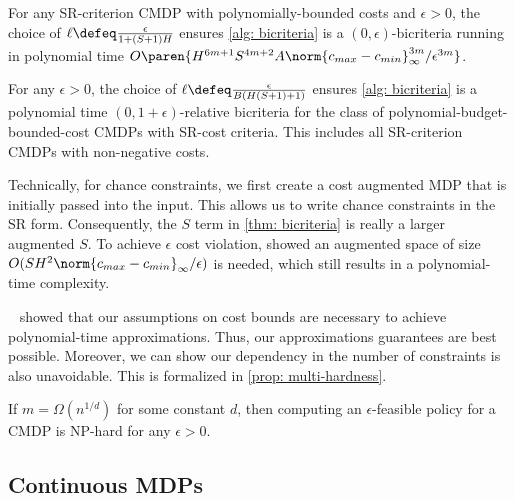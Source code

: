 \documentclass[pdftex, a4paper, 12pt]{article}
\newcommand{\cmin}{c_{min}}
\newcommand{\cmax}{c_{max}}
\begin{document}
\begin{theorem}[Bicriteria]\label{thm: bicriteria}
    For any SR-criterion CMDP with polynomially-bounded costs and $\epsilon > 0$, the choice of $\ell \defeq \frac{\epsilon}{1 + (S+1)H}$ ensures \cref{alg: bicriteria} is a $(0, \epsilon)$-bicriteria running in polynomial time $O\paren{H^{6m+1}S^{4m+2}A\norm{\cmax - \cmin}_{\infty}^{3m}/\epsilon^{3m}}$. 
\end{theorem}

\begin{corollary}[Relative]\label{cor: relative}
    For any $\epsilon > 0$, the choice of $\ell \defeq \frac{\epsilon}{B(H(S+1) + 1)}$ ensures \cref{alg: bicriteria} is a polynomial time $(0, 1+\epsilon)$-relative bicriteria for the class of polynomial-budget-bounded-cost CMDPs with SR-cost criteria. This includes all SR-criterion CMDPs with non-negative costs.
\end{corollary}

\begin{remark}
    Technically, for chance constraints, we first create a cost augmented MDP that is initially passed into the input. This allows us to write chance constraints in the SR form. Consequently, the $S$ term in \cref{thm: bicriteria} is really a larger augmented $S$. To achieve $\epsilon$ cost violation, \cite{acRL} showed an augmented space of size $O(SH^2\norm{\cmax - \cmin}_{\infty}/\epsilon)$ is needed, which still results in a polynomial-time complexity.
\end{remark}

\begin{remark}\label{rem: optimality}
    ~\cite{acRL} showed that our assumptions on cost bounds are necessary to achieve polynomial-time approximations. Thus, our approximations guarantees are best possible. Moreover, we can show our dependency in the number of constraints is also unavoidable. This is formalized in \cref{prop: multi-hardness}.
\end{remark}

\begin{proposition}\label{prop: multi-hardness}
    If $m = \Omega(n^{1/d})$ for some constant $d$, then computing an $\epsilon$-feasible policy for a CMDP is NP-hard for any $\epsilon > 0$.
\end{proposition}


\subsection{Continuous MDPs}\label{subsec: continous}
\end{document}

